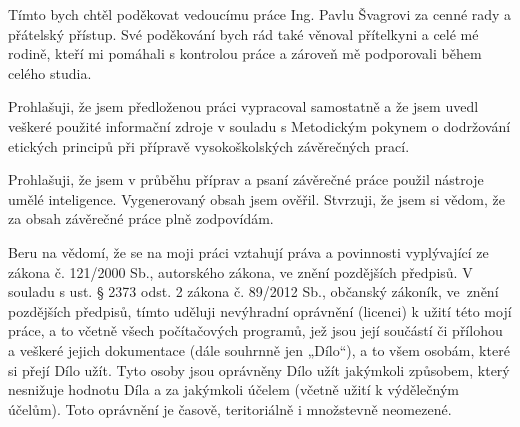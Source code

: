 \documentclass[czech,master,unicode,twoside]{ctufit-thesis}
\begin{document}
 
\frontmatter\frontmatterinit %

\thispagestyle{empty}\maketitle\thispagestyle{empty}\cleardoublepage %


\imprintpage %
\stopTOCentries

\begin{acknowledgmentpage}
Tímto bych chtěl poděkovat vedoucímu práce Ing. Pavlu Švagrovi za cenné rady a přátelský přístup. Své poděkování bych rád také věnoval přítelkyni a celé mé rodině, kteří mi pomáhali s kontrolou práce a zároveň mě podporovali během celého studia.
\end{acknowledgmentpage} 


\begin{declarationpage}
Prohlašuji, že jsem předloženou práci vypracoval samostatně a že jsem uvedl veškeré použité informační zdroje v souladu s Metodickým pokynem o dodržování etických principů při přípravě vysokoškolských závěrečných prací.

Prohlašuji, že jsem v průběhu příprav a psaní závěrečné práce použil nástroje umělé inteligence. Vygenerovaný obsah jsem ověřil. Stvrzuji, že jsem si vědom, že za obsah závěrečné práce plně zodpovídám.

Beru na vědomí, že se na moji práci vztahují práva a povinnosti vyplývající ze zákona č. 121/2000 Sb., autorského zákona, ve znění pozdějších předpisů. V souladu s ust. § 2373 odst. 2 zákona č. 89/2012 Sb., občanský zákoník, ve~znění pozdějších předpisů, tímto uděluji nevýhradní oprávnění (licenci) k užití této mojí práce, a to včetně všech počítačových programů, jež jsou její součástí či přílohou a veškeré jejich dokumentace (dále souhrnně jen „Dílo“), a to všem osobám, které si přejí Dílo užít. Tyto osoby jsou oprávněny Dílo užít jakýmkoli způsobem, který nesnižuje hodnotu Díla a za jakýmkoli účelem (včetně užití k výdělečným účelům). Toto oprávnění je časově, teritoriálně i množstevně neomezené.
\end{declarationpage}
\end{document}
